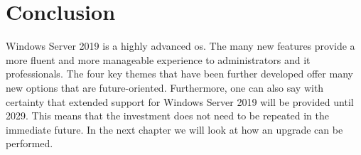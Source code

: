 
\autocite{Haag2016}

\section{Conclusion}
Windows Server 2019 is a highly advanced \acrfull{os}. The many new features provide a more fluent and more manageable experience to administrators and \acrshort{it} professionals. The four key themes that have been further developed offer many new options that are future-oriented. Furthermore, one can also say with certainty that extended support for Windows Server 2019 will be provided until 2029. This means that the investment does not need to be repeated in the immediate future. In the next chapter we will look at how an upgrade can be performed.  